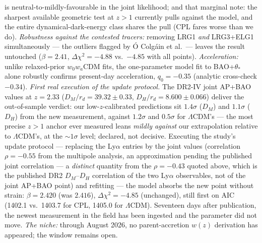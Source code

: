 \documentclass[11pt]{article}
\begin{document}
is neutral-to-mildly-favourable in the joint likelihood; and that marginal note: the sharpest available geometric test at $z > 1$ currently pulls against the model, and the entire dynamical-dark-energy class shares the pull (CPL fares worse than we do). \emph{Robustness against the contested tracers:} removing LRG1 \emph{and} LRG3+ELG1 simultaneously --- the outliers flagged by \'O Colg\'ain et al.\ --- leaves the result untouched ($\beta = 2.41$, $\Delta\chi^2 = -4.88$ vs.\ $-4.85$ with all points). \emph{Acceleration:} unlike relaxed-prior $w_0w_a$CDM fits, the one-parameter model fit to BAO+$\theta_*$ alone robustly confirms present-day acceleration, $q_0 = -0.35$ (analytic cross-check $-0.34$). \emph{First real execution of the update protocol.} The DR2-IV joint AP+BAO values at $z = 2.33$ ($D_M/r_d = 39.32 \pm 0.33$, $D_H/r_d = 8.600 \pm 0.066$) deliver the out-of-sample verdict: our low-$z$-calibrated predictions sit $1.4\sigma$ ($D_M$) and $1.1\sigma$ ($D_H$) from the new measurement, against $1.2\sigma$ and $0.5\sigma$ for $\Lambda$CDM's --- the most precise $z>1$ anchor ever measured leans \emph{mildly against} our extrapolation relative to $\Lambda$CDM's, at the $\sim1\sigma$ level; declared, not decisive. Executing the study's update protocol --- replacing the Ly$\alpha$ entries by the joint values (correlation $\rho = -0.55$ from the multipole analysis, an approximation pending the published joint correlation --- a \emph{distinct} quantity from the $\rho = -0.43$ quoted above, which is the published DR2 $D_M$--$D_H$ correlation of the two Ly$\alpha$ observables, not of the joint AP+BAO point) and refitting --- the model absorbs the new point without strain: $\beta = 2.420$ (was $2.416$), $\Delta\chi^2 = -4.85$ (unchanged), still first on AIC (1402.1 vs.\ 1403.7 for CPL, 1405.0 for $\Lambda$CDM). Seventeen days after publication, the newest measurement in the field has been ingested and the parameter did not move. \emph{The niche:} through August 2026, no parent-accretion $w(z)$ derivation has appeared; the window remains open.
\end{document}
